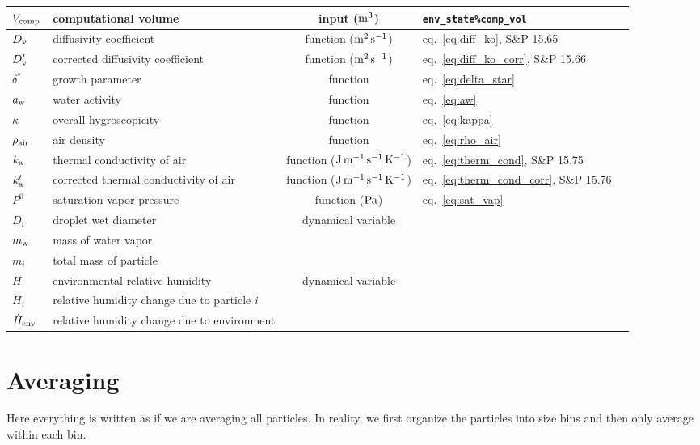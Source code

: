 \documentclass{article}
\begin{document}
\begin{tabular}{lp{4cm}clp{3cm}}
$V_{\rm comp}$ & computational volume & input ($\rm m^3$) & \verb+env_state%comp_vol+\\
\hline
$D_{\rm v}$     & diffusivity coefficient  &  function ($\rm m^2\, s^{-1}$) & eq.~\ref{eq:diff_ko}, S\&P 15.65  \\
$D_{\rm v}'$     & corrected diffusivity coefficient   &  function ($\rm m^2\, s^{-1}$) & eq.~\ref{eq:diff_ko_corr}, S\&P 15.66  \\
$\delta^*$  & growth parameter & function & eq.~\ref{eq:delta_star}\\
$a_{\rm w}$  & water activity  & function & eq.~\ref{eq:aw}   \\
$\kappa$      &  overall hygroscopicity   &  function &  eq.~\ref{eq:kappa}  \\
$\rho_{\rm air}$    &  air density   &  function &  eq.~\ref{eq:rho_air}  \\
$k_{\rm a}$     & thermal conductivity of air   &  function ($\rm J\,m^{-1}\, s^{-1} \, K^{-1}$) &  eq.~\ref{eq:therm_cond}, S\&P 15.75   \\
$k_{\rm a}'$    & corrected thermal conductivity of air   &  function ($\rm J\,m^{-1}\, s^{-1} \, K^{-1}$) &  eq.~\ref{eq:therm_cond_corr}, S\&P 15.76   \\
$P^0$   & saturation vapor pressure &  function ($\rm Pa$) & eq.~\ref{eq:sat_vap}  \\
$D_i$     &  droplet wet diameter  & dynamical variable  &     \\
$m_{\rm  w}$ & mass of water vapor & \\
$m_{i}$ & total mass of particle & \\
$H$     &  environmental relative humidity  &  dynamical variable &  \\
$\dot{H}_i$    & relative humidity change due to particle $i$ &  &  \\
$\dot{H}_{\rm env}$     & relative humidity change due to environment &  &  \\
\hline 
\end{tabular}

\newpage

\section{Averaging}

Here everything is written as if we are averaging all particles. In
reality, we first organize the particles into size bins and then only
average within each bin.
\end{document}
